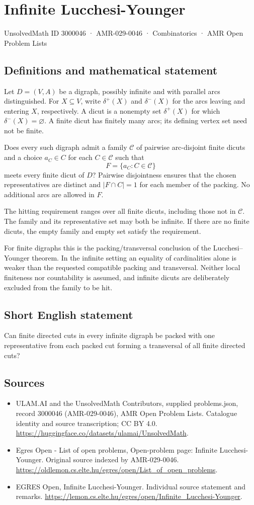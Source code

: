 \documentclass[11pt,a4paper]{article}
\begin{document}
\section*{Infinite Lucchesi-Younger}\label{3000046}
{\small UnsolvedMath ID 3000046 · AMR-029-0046 · Combinatorics · AMR Open Problem Lists}
\subsection{Definitions and mathematical statement}
Let $D=(V,A)$ be a digraph, possibly infinite and with parallel arcs
distinguished. For $X\subseteq V$, write $\delta^+(X)$ and
$\delta^-(X)$ for the arcs leaving and entering $X$, respectively.
A dicut is a nonempty set $\delta^+(X)$ for which
$\delta^-(X)=\varnothing$. A finite dicut has finitely many arcs;
its defining vertex set need not be finite.

Does every such digraph admit a family $\mathcal C$ of pairwise
arc-disjoint finite dicuts and a choice $a_C\in C$ for each
$C\in\mathcal C$ such that
\[
                  F=\{a_C:C\in\mathcal C\}
\]
meets every finite dicut of $D$? Pairwise disjointness ensures that
the chosen representatives are distinct and $|F\cap C|=1$ for each
member of the packing. No additional arcs are allowed in $F$.

The hitting requirement ranges over all finite dicuts, including those
not in $\mathcal C$. The family and its representative set may both
be infinite. If there are no finite dicuts, the empty family and empty
set satisfy the requirement.

For finite digraphs this is the packing/transversal conclusion of the
Lucchesi--Younger theorem. In the infinite setting an equality of
cardinalities alone is weaker than the requested compatible packing
and transversal. Neither local finiteness nor countability is assumed,
and infinite dicuts are deliberately excluded from the family to be hit.
\subsection{Short English statement}
Can finite directed cuts in every infinite digraph be packed with one representative from each packed cut forming a transversal of all finite directed cuts?
\subsection{Sources}
\begin{itemize}
\item[S1] ULAM.AI and the UnsolvedMath Contributors, supplied problems.json, record 3000046 (AMR-029-0046), AMR Open Problem Lists. Catalogue identity and source transcription; CC BY 4.0.
\url{https://huggingface.co/datasets/ulamai/UnsolvedMath}.
\item[S2] Egres Open - List of open problems, Open-problem page: Infinite Lucchesi-Younger. Original source indexed by AMR-029-0046.
\url{https://oldlemon.cs.elte.hu/egres/open/List_of_open_problems}.
\item[S3] EGRES Open, Infinite Lucchesi-Younger. Individual source statement and remarks.
\url{https://lemon.cs.elte.hu/egres/open/Infinite_Lucchesi-Younger}.
\end{itemize}
\end{document}
